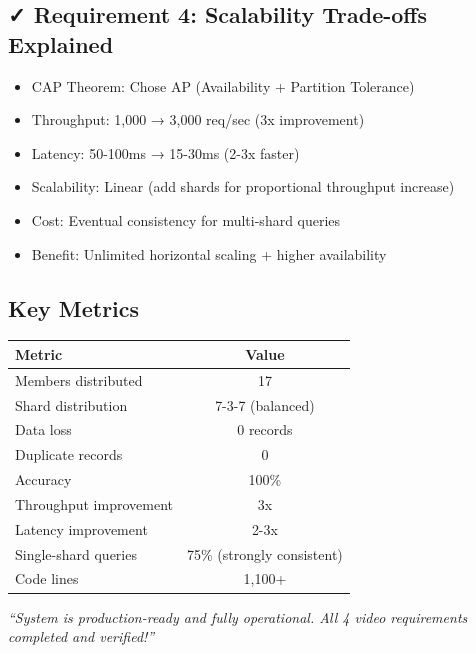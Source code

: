 \documentclass[12pt]{article}
\begin{document}
\subsection*{✓ Requirement 4: Scalability Trade-offs Explained}
\begin{itemize}
    \item CAP Theorem: Chose AP (Availability + Partition Tolerance)
    \item Throughput: 1,000 → 3,000 req/sec (3x improvement)
    \item Latency: 50-100ms → 15-30ms (2-3x faster)
    \item Scalability: Linear (add shards for proportional throughput increase)
    \item Cost: Eventual consistency for multi-shard queries
    \item Benefit: Unlimited horizontal scaling + higher availability
\end{itemize}

\subsection*{Key Metrics}

\begin{table}[h]
\centering
\begin{tabular}{|l|c|}
\hline
\textbf{Metric} & \textbf{Value} \\
\hline
Members distributed & 17 \\
Shard distribution & 7-3-7 (balanced) \\
Data loss & 0 records \\
Duplicate records & 0 \\
Accuracy & 100\% \\
Throughput improvement & 3x \\
Latency improvement & 2-3x \\
Single-shard queries & 75\% (strongly consistent) \\
Code lines & 1,100+ \\
\hline
\end{tabular}
\end{table}

\vspace{2em}

\textit{``System is production-ready and fully operational. All 4 video requirements completed and verified!''}
\end{document}
